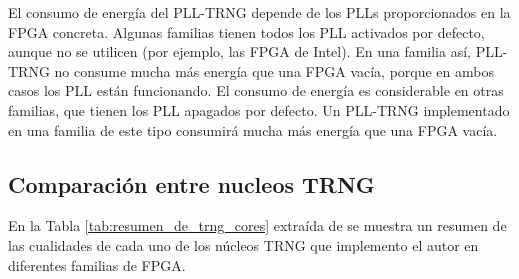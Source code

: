                 El consumo de energía del PLL-TRNG depende de los PLLs proporcionados en la FPGA concreta. Algunas familias tienen todos los PLL activados por defecto, aunque no se utilicen (por ejemplo, las FPGA de Intel). En una familia así, PLL-TRNG no consume mucha más energía que una FPGA vacía, porque en ambos casos los PLL están funcionando. El consumo de energía es considerable en otras familias, que tienen los PLL apagados por defecto. Un PLL-TRNG implementado en una familia de este tipo consumirá mucha más energía que una FPGA vacía.
				
            \subsection{Comparación entre nucleos TRNG}

            En la Tabla \ref{tab:resumen_de_trng_cores} extraída de \cite{Petura2016} se muestra un resumen de las cualidades de cada uno de los núcleos TRNG que implemento el autor en diferentes familias de FPGA.

